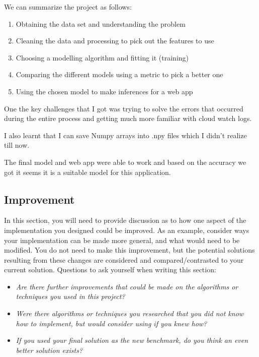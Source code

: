 \documentclass{article}
\begin{document}
We can summarize the project as follows:
\begin{enumerate}
    \item Obtaining the data set and understanding the problem
    \item Cleaning the data and processing to pick out the features to use
    \item Choosing a modelling algorithm and fitting it (training)
    \item Comparing the different models using a metric to pick a better one
    \item Using the chosen model to make inferences for a web app
\end{enumerate}

One the key challenges that I got was trying to solve the errors that
occurred during the entire process and getting much more familiar with
cloud watch logs.

I also learnt that I can save Numpy arrays into .npy files which I didn't
realize till now.

The final model and web app were able to work and based on the accuracy we got
it seems it is a suitable model for this application.

\subsection{Improvement}\label{improvement}

In this section, you will need to provide discussion as to how one
aspect of the implementation you designed could be improved. As an
example, consider ways your implementation can be made more general, and
what would need to be modified. You do not need to make this
improvement, but the potential solutions resulting from these changes
are considered and compared/contrasted to your current solution.
Questions to ask yourself when writing this section:

\begin{itemize}
\item
  \emph{Are there further improvements that could be made on the
  algorithms or techniques you used in this project?}
\item
  \emph{Were there algorithms or techniques you researched that you did
  not know how to implement, but would consider using if you knew how?}
\item
  \emph{If you used your final solution as the new benchmark, do you
  think an even better solution exists?}
\end{itemize}
\end{document}
